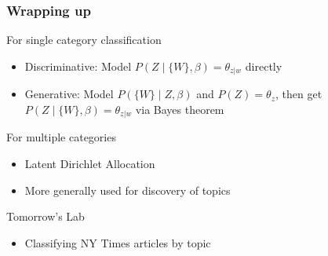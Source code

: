 \documentclass[11pt,compress,professionalfonts]{beamer}
\newcommand{\ita}{\begin{itemize}}
\newcommand{\itm}{\item[]}
\newcommand{\itz}{\end{itemize}}
\begin{document}
\begin{frame}[t,fragile]\frametitle{Wrapping up}
For single category classification
\ita
\itm Discriminative: Model $P(Z \mid \{W\}, \beta) = \theta_{z|w}$ directly
\itm Generative: Model $P(\{W\} \mid Z, \beta)$ and $P(Z)=\theta_z$, then get $P(Z \mid \{W\}, \beta) = \theta_{z|w}$ via Bayes theorem
\itz
For multiple categories
\ita
\itm Latent Dirichlet Allocation
\itm More generally used for discovery of topics
\itz
Tomorrow's Lab
\ita
\itm Classifying NY Times articles by topic
\itz
\end{frame}
\end{document}
